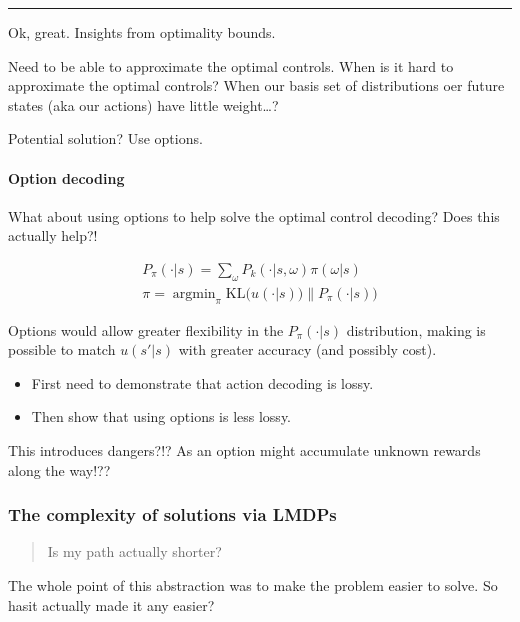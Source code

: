 \begin{center}\rule{0.5\linewidth}{\linethickness}\end{center}

Ok, great. Insights from optimality bounds.

Need to be able to approximate the optimal controls. When is it hard to
approximate the optimal controls? When our basis set of distributions
oer future states (aka our actions) have little weight\ldots{}?

Potential solution? Use options.

\hypertarget{option-decoding}{%
\paragraph{Option decoding}\label{option-decoding}}

What about using options to help solve the optimal control decoding?
Does this actually help?!

\begin{align}
P_{\pi}(\cdot | s) = \sum_\omega P_k(\cdot | s, \omega) \pi(\omega | s) \\
\pi = \mathop{\text{argmin}}_{\pi} \text{KL}\Big(u(\cdot | s))\parallel P_{\pi}(\cdot | s)\Big)
\end{align}

Options would allow greater flexibility in the \(P_{\pi}(\cdot | s)\)
distribution, making is possible to match \(u(s'|s)\) with greater
accuracy (and possibly cost).

\begin{itemize}
\tightlist
\item
  First need to demonstrate that action decoding is lossy.
\item
  Then show that using options is less lossy.
\end{itemize}

This introduces dangers?!? As an option might accumulate unknown rewards
along the way!??

\hypertarget{the-complexity-of-solutions-via-lmdps}{%
\subsubsection{The complexity of solutions via
LMDPs}\label{the-complexity-of-solutions-via-lmdps}}

\begin{quote}
Is my path actually shorter?
\end{quote}

The whole point of this abstraction was to make the problem easier to
solve. So hasit actually made it any easier?

